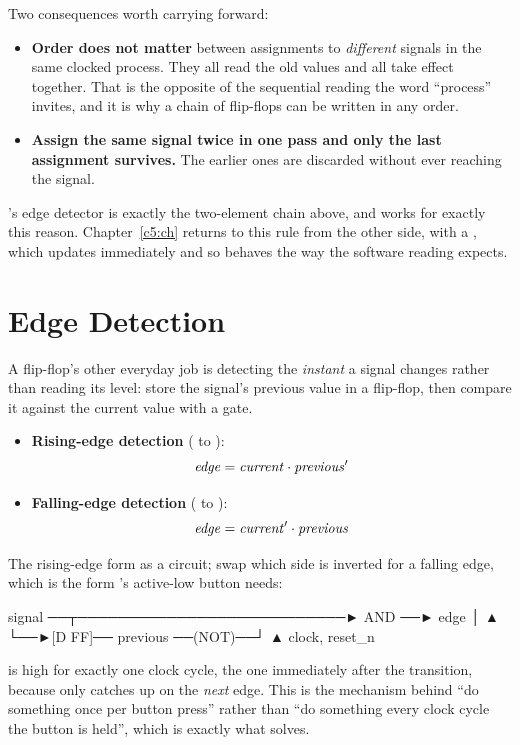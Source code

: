 Two consequences worth carrying forward:
\begin{itemize}
  \item \textbf{Order does not matter} between assignments to \emph{different} signals in the same
    clocked process. They all read the old values and all take effect together. That is the opposite
    of the sequential reading the word ``process'' invites, and it is why a chain of flip-flops can
    be written in any order.
  \item \textbf{Assign the same signal twice in one pass and only the last assignment survives.} The
    earlier ones are discarded without ever reaching the signal.
\end{itemize}
's edge detector is exactly the two-element chain above, and works for exactly this
reason. Chapter~\ref{c5:ch} returns to this rule from the other side, with a , which
updates immediately and so behaves the way the software reading expects.

\section{Edge Detection}
\label{c3:a7}
A flip-flop's other everyday job is detecting the \emph{instant} a signal changes rather than reading
its level: store the signal's previous value in a flip-flop, then compare it against the current
value with a gate.
\begin{itemize}
  \item \textbf{Rising-edge detection} ( to ):
    \[ \mathit{edge} = \mathit{current} \cdot \mathit{previous}' \]
  \item \textbf{Falling-edge detection} ( to ):
    \[ \mathit{edge} = \mathit{current}' \cdot \mathit{previous} \]
\end{itemize}
The rising-edge form as a circuit; swap which side is inverted for a falling edge, which is the form
's active-low button needs:

\begin{textdrawing}
signal ──┬───────────────────────────► AND ──► edge
         │                              ▲
         └──►[D FF]── previous ──(NOT)──┘
                ▲
           clock, reset_n
\end{textdrawing}

\noindent{} is high for exactly one clock cycle, the one immediately after the transition,
because  only catches up on the \emph{next} edge. This is the mechanism behind ``do
something once per button press'' rather than ``do something every clock cycle the button is held'',
which is exactly what  solves.

